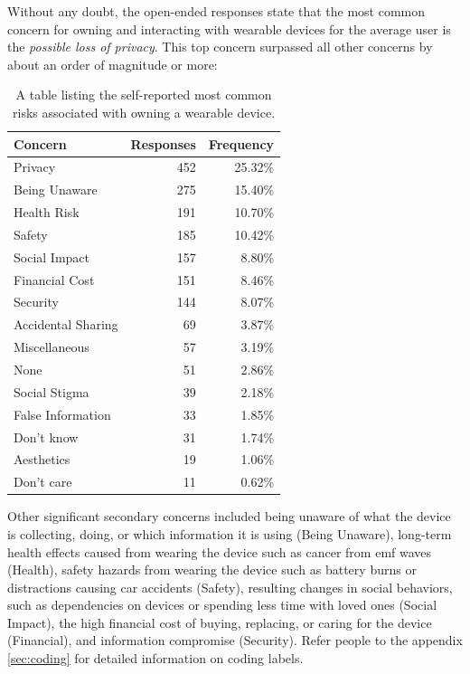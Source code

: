 \documentclass{acm_proc_article-sp}
\begin{document}
Without any doubt, the open-ended responses state that the most common concern for owning and interacting with wearable devices for the average user is the \textit{possible loss of privacy}. This top concern surpassed all other concerns by about an order of magnitude or more:

\begin{table}[h]
\begin{center}
\begin{tabular}{|l|r|r|}
\hline
Concern &  Responses &  Frequency   \\
\hline
Privacy & 452 & 25.32\% \\
Being Unaware & 275 & 15.40\% \\
Health Risk & 191 & 10.70\%\\
Safety & 185 & 10.42\%\\
Social Impact &	157 & 8.80\%\\
Financial Cost & 151 & 8.46\%\\
Security &	144 & 8.07\%\\
Accidental Sharing &	69 & 3.87\%\\
Miscellaneous &	57 & 3.19\%\\
None	& 51 & 2.86\%\\
Social Stigma &	39 & 2.18\%\\
False Information & 33 & 1.85\%\\
Don't know & 31 & 1.74\%\\
Aesthetics 	& 19 & 1.06\%\\
Don't care 	& 11 & 0.62\%\\
\hline
\end{tabular}
\caption{A table listing the self-reported most common risks associated with owning a wearable device.}
\label{open-responses}
\end{center}
\end{table}

Other significant secondary concerns included being unaware of what the device is collecting, doing, or which information it is using (Being Unaware), long-term health effects caused from wearing the device such as cancer from emf waves (Health), safety hazards from wearing the device such as battery burns or distractions causing car accidents (Safety), resulting changes in social behaviors, such as dependencies on devices or spending less time with loved ones (Social Impact), the high financial cost of buying, replacing, or caring for the device (Financial), and information compromise (Security). Refer people to the appendix \ref{sec:coding} for detailed information on coding labels. 
\end{document}
